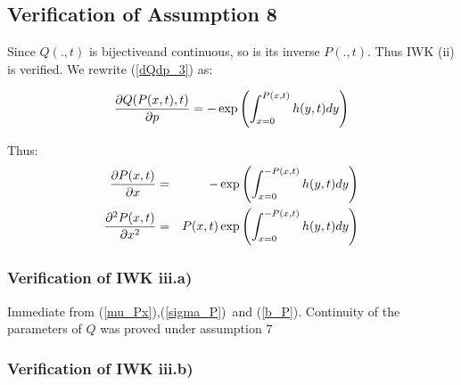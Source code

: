 \documentclass{article}
\begin{document}

\subsection{Verification of Assumption 8}

Since $Q(.,t)$ is bijectiveand continuous, so is its inverse $P(.,t)$. Thus 
IWK (ii) is verified. We rewrite (\ref{dQdp_3}) as:

\begin{equation*}
\frac{\partial Q(P(x,t),t)}{\partial p}=-\exp \left( {%
\int_{x=0}^{P(x,t)}h(y,t)dy}\right) 
\end{equation*}

Thus:%
\begin{eqnarray}
\frac{\partial P(x,t)}{\partial x} &=&-\exp \left( {%
\int_{x=0}^{-P(x,t)}h(y,t)dy}\right)   \label{dPdx} \\
\frac{\partial ^{2}P(x,t)}{\partial x^{2}} &=&P(x,t)\exp \left( {%
\int_{x=0}^{-P(x,t)}h(y,t)dy}\right)   \label{dPdx_square}
\end{eqnarray}

\subsubsection{Verification of IWK iii.a) }

Immediate from (\ref{mu_Px}),(\ref{sigma_P})\ and (\ref{b_P}). Continuity of
the parameters of $Q$ was proved under assumption 7

\bigskip 

\subsubsection{Verification of IWK iii.b)}
\end{document}

